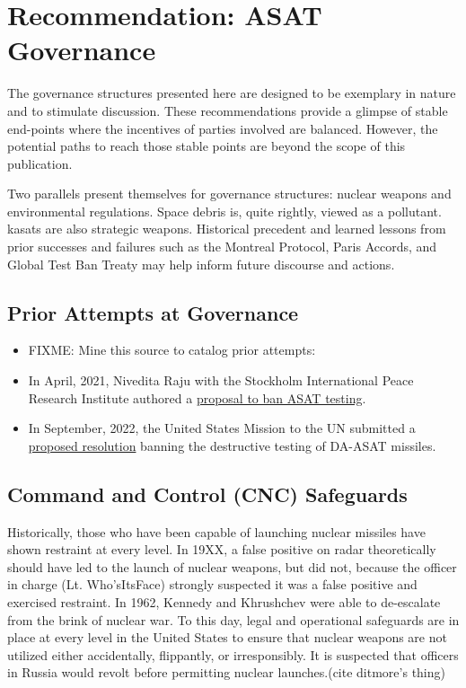 \section{Recommendation: ASAT Governance}

The governance structures presented here are designed to be exemplary
in nature and to stimulate discussion.  These recommendations provide
a glimpse of stable end-points where the incentives of parties
involved are balanced.  However, the potential paths to reach those
stable points are beyond the scope of this publication.

Two parallels present themselves for governance structures: nuclear
weapons and environmental regulations.  Space debris is, quite
rightly, viewed as a pollutant.  \acp{kasat} are also strategic
weapons.  Historical precedent and learned lessons from prior
successes and failures such as the Montreal Protocol, Paris Accords,
and Global Test Ban Treaty may help inform future discourse and
actions.


\subsection{Prior Attempts at Governance}
\begin{itemize}

\item FIXME: Mine this source to catalog prior attempts:
  \cite{early-to-call}

\item In April, 2021, Nivedita Raju with the Stockholm International
  Peace Research Institute authored a
  \href{https://www.sipri.org/sites/default/files/2021-04/eunpdc_no_74.pdf}{
    proposal to ban ASAT testing}.\cite{eu-ban}

\item In September, 2022, the United States Mission to the UN
  submitted a
  \href{https://uploads.mwp.mprod.getusinfo.com/uploads/sites/25/2022/09/US-ASAT-Documents-1-1.pdf}{proposed
    resolution} banning the destructive testing of DA-ASAT
  missiles.\cite{un-asat-me-not}

\end{itemize}


\subsection{Command and Control (CNC) Safeguards}
Historically, those who have been capable of launching nuclear
missiles have shown restraint at every level.  In 19XX, a false
positive on radar theoretically should have led to the launch of
nuclear weapons, but did not, because the officer in charge
(Lt. Who'sItsFace) strongly suspected it was a false positive and
exercised restraint.  In 1962, Kennedy and Khrushchev were able to
de-escalate from the brink of nuclear war.  To this day, legal and
operational safeguards are in place at every level in the United
States to ensure that nuclear weapons are not utilized either
accidentally, flippantly, or irresponsibly.  It is suspected that
officers in Russia would revolt before permitting nuclear
launches.(cite ditmore's thing)

